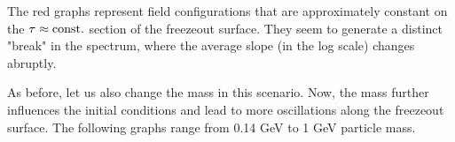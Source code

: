 {\begin{minipage}{\linewidth}
{\begin{minipage}{0.4\linewidth}
            \end{minipage}
        }
        \label{fig:SpecRealConstEps_m140}
    \end{minipage}
}
The red graphs represent field configurations that are approximately constant on the ${\tau\approx{\text{const.}}}$ section of the freezeout surface. They seem to generate a distinct "break" in the spectrum, where the average slope (in the log scale) changes abruptly.

As before, let us also change the mass in this scenario. Now, the mass further influences the initial conditions and lead to more oscillations along the freezeout surface. The following graphs range from 0.14 GeV to 1 GeV particle mass.

